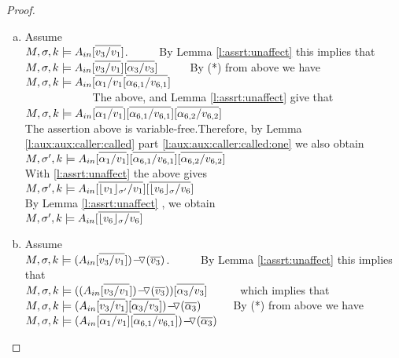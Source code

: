 \begin{proof}
\begin{enumerate}[a.]
\item
Assume  \\
  $\satDAssertFrom M  \sigma k   \Ain[\overline {v_3/v_1}] $. 
      \ \ \ \ \ By Lemma \ref{l:assrt:unaffect}    this  implies that \\
$\satDAssertFrom M  \sigma k   \Ain[\overline {v_3/v_1}][\overline { {\alpha_3}/v_3 }] $   
      \ \ \ \ \ By (*) from above we have\\
$\satDAssertFrom M  \sigma k   \Ain[\overline  {\alpha_1 /v_1}  [\overline { \alpha_{6,1}/v_{6,1}}] $ \\    
$\strut \hspace{2cm}  $ The above, and   Lemma \ref{l:assrt:unaffect}     give that\\
$\satDAssertFrom M  \sigma k   \Ain[\overline { \alpha_1/v_1}]  [\overline { \alpha_{6,1}/v_{6,1}}]  [\overline { \alpha_{6,2}/v_{6,2}}]$ 
\\ The assertion above is variable-free.Therefore,  by Lemma \ref{l:aux:aux:caller:called} part \ref{l:aux:aux:caller:called:one} we also obtain\\ 
$\satDAssertFrom M   {\sigma'} k   {\Ain[\overline {\alpha_1/v_1}]  [\overline { \alpha_{6,1}/v_{6,1}}]  [\overline { \alpha_{6,2}/v_{6,2}}]}$ \\
With  \ref{l:assrt:unaffect}    the above gives \\
$\satDAssertFrom M  {\sigma'}  k  { \Ain[\overline{  \interpret {\sigma'} {v_1}/v_1}]  [\overline {  \interpret {\sigma} {v_6}/v_6 }]}$\\
 By Lemma \ref{l:assrt:unaffect}   , we obtain \\
$\satDAssertFrom M   {\sigma'}  k  { \Ain   [\overline {  \interpret {\sigma} {v_6}/v_6 }]}$
\item
Assume\\
$ \satDAssertFrom M  \sigma k    {\PushASLong  {(\overline {v_3})} {(\Ain[\overline {v_3/v_1}])}}$. 
 \ \ \ \ \ By Lemma \ref{l:assrt:unaffect}    this  implies that \\
 $ \satDAssertFrom M  \sigma k    {(\PushASLong  {(\overline {v_3})} {(\Ain[\overline {v_3/v_1} ])}) [\overline { {\alpha_3}/v_3 }] }$
 \ \ \ \ \ which implies that\\
$ \satDAssertFrom M  \sigma k   { \PushASLong  {(\overline {\alpha_3})} {(\Ain[\overline {v_3/v_1} ][\overline { {\alpha_3}/v_3 }]) }  }$
      \ \ \ \ \ By (*) from above we have\\
$\satDAssertFrom M  \sigma k  { \PushASLong  {(\overline {\alpha_3})}  {( \Ain[\overline  {\alpha_1 /v_1}]  [\overline { \alpha_{6,1}/v_{6,1}}] )}}$

\end{enumerate}
\end{proof}
